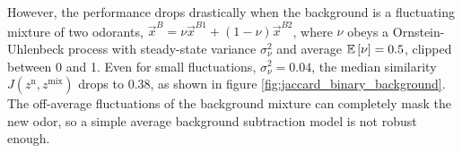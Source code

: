 However, the performance drops drastically when the background is a fluctuating mixture of two odorants, $\vec{x}^B = \nu \vec{x}^{B1} + (1-\nu) \vec{x}^{B2}$, where $\nu$ obeys a Ornstein-Uhlenbeck process with steady-state variance $\sigma^2_{\nu}$ and average $\mathbb{E}\left[ \nu \right] = 0.5$, clipped between 0 and 1. Even for small fluctuations, $\sigma_{\nu}^2 = 0.04$, the median similarity $J(z^{\mathrm{n}}, z^{\mathrm{mix}})$ drops to $0.38$, as shown in figure \ref{fig:jaccard_binary_background}. The off-average fluctuations of the background mixture can completely mask the new odor, so a simple average background subtraction model is not robust enough. 